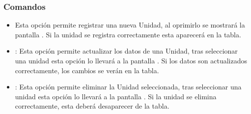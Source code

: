 \subsubsection{Comandos}
\begin{itemize}
 \item {} Esta opción permite registrar una nueva Unidad, al oprimirlo se mostrará la pantalla . Si la unidad se registra correctamente esta aparecerá en la tabla.
 
 \item {}: Esta opción permite actualizar los datos de una Unidad, tras seleccionar una unidad esta opción lo llevará a la pantalla . Si los datos son actualizados correctamente, los cambios se verán en la tabla.

 \item {}: Esta opción permite eliminar la Unidad seleccionada, tras seleccionar una unidad esta opción lo llevará a la pantalla . Si la unidad se elimina correctamente, esta deberá desaparecer de la tabla.
\end{itemize}

